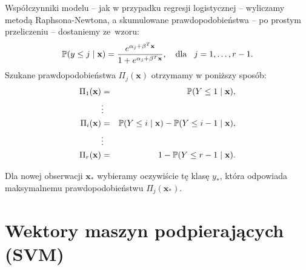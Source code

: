\documentclass{mini}
\begin{document}
Współczynniki modelu -- jak w przypadku regresji logistycznej -- wyliczamy metodą Raphsona-Newtona, a skumulowane prawdopodobieństwa -- po prostym przeliczeniu -- dostaniemy ze~wzoru:
$$
\mathbb{P}(y\leq j \hspace{1mm}|\hspace{1mm} \mathbf{x})=\dfrac{e^{\alpha_j+\mathbf{\beta}^T\mathbf{x}}}{1+e^{\alpha_j+\mathbf{\beta}^T\mathbf{x}}},\quad \textrm{dla}\hspace{3mm} j=1,\ldots,r-1.
$$ 
Szukane prawdopodobieństwa $\Pi_j(\mathbf{x})$ otrzymamy w poniższy sposób:
\begin{eqnarray*}
\Pi_1(\mathbf{x}) &=& \mathbb{P}(Y\leq 1 \hspace{1mm}|\hspace{1mm}\mathbf{x}),\\
&\vdots&\\
\Pi_i(\mathbf{x}) &=& \mathbb{P}(Y\leq i \hspace{1mm}|\hspace{1mm} \mathbf{x}) - \mathbb{P}(Y\leq i-1 \hspace{1mm}|\hspace{1mm} \mathbf{x}),\\
&\vdots&\\
\Pi_r(\mathbf{x}) &=& 1 - \mathbb{P}(Y\leq r-1 \hspace{1mm}|\hspace{1mm} \mathbf{x}).
\end{eqnarray*}

Dla nowej obserwacji $\mathbf{x}_{\ast}$ wybieramy oczywiście tę klasę $y_{\ast}$, która odpowiada maksymalnemu prawdopodobieństwu $\Pi_j(\mathbf{x}_{\ast})$.

\section{Wektory maszyn podpierających (SVM)}
\end{document}
